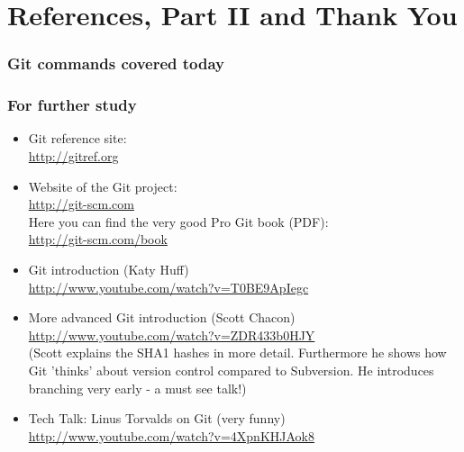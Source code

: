 \documentclass{gittalk}
\begin{document}
\section{References, Part II and Thank You}

\begin{frame}
\frametitle{Git commands covered today}
\begin{center}
        
\end{center}
\end{frame}

\begin{frame}
\frametitle{For further study}
\begin{itemize}
  \item Git reference site:\\
  \url{http://gitref.org}
  \item Website of the Git project:\\
  \url{http://git-scm.com}\\
  Here you can find the very good Pro Git book (PDF):\\
  \url{http://git-scm.com/book}
  \item Git introduction (Katy Huff)\\
        \url{http://www.youtube.com/watch?v=T0BE9ApIegc}
  \item More advanced Git introduction (Scott Chacon)\\
        \url{http://www.youtube.com/watch?v=ZDR433b0HJY}\\
        (Scott explains the SHA1 hashes in more detail. Furthermore he shows
        how Git 'thinks' about version control compared to Subversion. He
        introduces branching very early - a must see talk!)
  \item Tech Talk: Linus Torvalds on Git (very funny)\\
        \url{http://www.youtube.com/watch?v=4XpnKHJAok8}
\end{itemize}
\end{frame}
\end{document}
